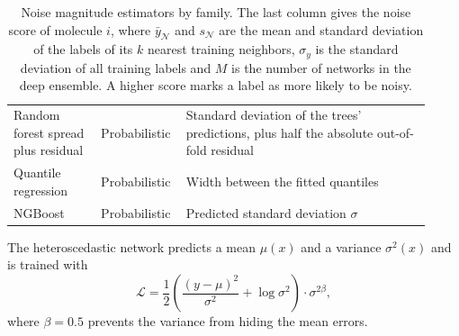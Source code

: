 \begin{table}[htbp]
\begin{adjustbox}{max width=\textwidth,max totalheight=0.78\textheight}
\begin{tabular}{@{}P{0.2\linewidth}P{0.15\linewidth}P{0.57\linewidth}@{}}
Random forest spread plus residual & Probabilistic & Standard deviation of the trees' predictions, plus half the absolute out-of-fold residual \\
Quantile regression & Probabilistic & Width between the fitted quantiles \\
NGBoost & Probabilistic & Predicted standard deviation $\sigma$ \citep{Duan2020} \\
\bottomrule
\end{tabular}
\end{adjustbox}
\caption[Noise magnitude estimators.]{Noise magnitude estimators by family. The last column gives the noise score of molecule $i$, where $\bar y_{\mathcal{N}}$ and $s_{\mathcal{N}}$ are the mean and standard deviation of the labels of its $k$ nearest training neighbors, $\sigma_y$ is the standard deviation of all training labels and $M$ is the number of networks in the deep ensemble. A higher score marks a label as more likely to be noisy.}
\label{tab:noise_estimators}
\end{table}

The heteroscedastic network predicts a mean $\mu(x)$ and a variance $\sigma^2(x)$ and is trained with
\begin{equation}
\mathcal{L} = \frac{1}{2}\left(\frac{(y - \mu)^2}{\sigma^2} + \log \sigma^2\right) \cdot \sigma^{2\beta},
\label{eq:beta_nll}
\end{equation}
where $\beta = 0.5$ prevents the variance from hiding the mean errors.

